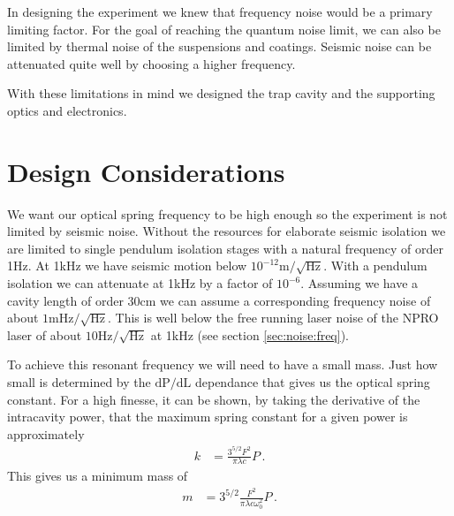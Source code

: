 \acresetall

In designing the experiment we knew that frequency noise would be a
primary limiting factor.
For the goal of reaching the quantum noise limit, we can also be limited
by thermal noise of the suspensions and coatings.
Seismic noise can be attenuated quite well by choosing a higher frequency.

With these limitations in mind we designed the trap cavity and the supporting
optics and electronics.

%
%


\section{Design Considerations}
\label{sec:lintrap:design}

We want our optical spring frequency to be high enough so the experiment is
not limited by seismic noise.
Without the resources for elaborate seismic isolation we are limited to single
pendulum isolation stages with a natural frequency of order 1Hz.
At 1kHz we have seismic motion below $10^{-12} \mathrm{m/\sqrt{Hz}}$.
With a pendulum isolation we can attenuate at 1kHz by a factor of $10^{-6}$.
Assuming we have a cavity length of order 30cm we can assume a corresponding
frequency noise of about $1 \mathrm{mHz/\sqrt{Hz}}$.
This is well below the free running laser noise of the NPRO laser of about
$10\mathrm{Hz/\sqrt{Hz}}$ at 1kHz (see section \ref{sec:noise:freq}).


To achieve this resonant frequency we will need to have a small mass.
Just how small is determined by the $\mathrm{dP/dL}$ dependance that gives
us the optical spring constant.
For a high finesse, it can be shown, by taking the derivative of the
intracavity power,
that the maximum spring constant for a given power is approximately
\begin{align}
k &= \frac{3^{5/2} F^2}{\pi \lambda c} P \,.
\end{align}
This gives us a minimum mass of
\begin{align}
m &= 3^{5/2} \frac{F^2}{\pi \lambda c \omega^2_0} P \, .
\end{align}


